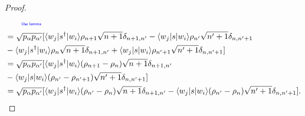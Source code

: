 \documentclass[../../note.tex]{subfiles}
\begin{document}
\begin{proof}
\begin{align}
        &\qquad\text{\color{blue}{\tiny\sffamily Use lemma }} \nonumber \\
        &= \sqrt{p_{\alpha} p_{\alpha^\prime}} [\langle w_j \vert s^\dagger \vert w_i \rangle \rho_{n+1} \sqrt{n+1} \delta_{n+1, n^\prime} - \langle w_j \vert s \vert w_i \rangle \rho_{n^\prime} \sqrt{n^\prime + 1} \delta_{n, n^\prime + 1} \nonumber \\
        &- \langle w_j \vert s^\dagger \vert w_i \rangle \rho_n \sqrt{n+1}\delta_{n+1, n^\prime} + \langle w_j \vert s \vert w_i \rangle \rho_{n^\prime + 1} \sqrt{n^\prime + 1} \delta_{n, n^\prime + 1}] \\
        &= \sqrt{p_{\alpha} p_{\alpha^\prime}}[\langle w_j \vert s^\dagger \vert w_i \rangle (\rho_{n+1} - \rho_n)\sqrt{n+1}\delta_{n+1, n^\prime} \nonumber \\
        &- \langle w_j \vert s \vert w_i \rangle (\rho_{n^\prime} - \rho_{n^\prime + 1})\sqrt{n^\prime + 1}\delta_{n, n^\prime + 1}] \\
        &= \sqrt{p_{\alpha} p_{\alpha^\prime}}[\langle w_j \vert s^\dagger \vert w_i \rangle (\rho_{n^\prime} - \rho_n)\sqrt{n+1}\delta_{n+1, n^\prime}
        - \langle w_j \vert s \vert w_i \rangle (\rho_{n^\prime} - \rho_{n})\sqrt{n^\prime + 1}\delta_{n, n^\prime + 1}].
    \end{align}
\end{proof}
\end{document}
